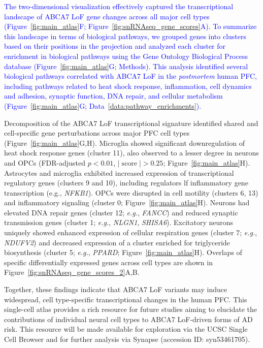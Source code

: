 \newcommand{\quoteG}{\textcolor{blue}{The two-dimensional visualization effectively captured the transcriptional landscape of ABCA7 LoF gene changes across all major cell types (Figure~\ref{fig:main_atlas}F; Figure~\ref{fig:snRNAseq_gene_scores}A). To summarize this landscape in terms of biological pathways, we grouped genes into clusters based on their positions in the projection and analyzed each cluster for enrichment in biological pathways using the Gene Ontology Biological Process database (Figure~\ref{fig:main_atlas}G; Methods). This analysis identified several biological pathways correlated with ABCA7 LoF in the \textit{postmortem} human PFC, including pathways related to heat shock response, inflammation, cell dynamics and adhesion, synaptic function, DNA repair, and cellular metabolism (Figure~\ref{fig:main_atlas}G; Data~\ref{data:pathway_enrichments}).\label{quoteG-label}}}\quoteG

Decomposition of the ABCA7 LoF transcriptional signature identified shared and cell-specific gene perturbations across major PFC cell types (Figure~\ref{fig:main_atlas}G,H). Microglia showed significant downregulation of heat shock response genes (cluster 11), also observed to a lesser degree in neurons and OPCs (FDR-adjusted $p<0.01$, $|\operatorname{score}|>0.25$; Figure~\ref{fig:main_atlas}H). Astrocytes and microglia exhibited increased expression of transcriptional regulatory genes (clusters 9 and 10), including regulators lf inflammatory gene transcription (e.g., \textit{NFKB1}). OPCs were disrupted in cell motility (clusters 6, 13) and inflammatory signaling (cluster 0; Figure~\ref{fig:main_atlas}H). Neurons had elevated DNA repair genes (cluster 12; \textit{e.g.}, \textit{FANCC}) and reduced synaptic transmission genes (cluster 1; \textit{e.g.}, \textit{NLGN1}, \textit{SHISA6}). Excitatory neurons uniquely showed enhanced expression of cellular respiration genes (cluster 7; \textit{e.g.}, \textit{NDUFV2}) and decreased expression of a cluster enriched for triglyceride biosynthesis (cluster 5; \textit{e.g.}, \textit{PPARD}; Figure~\ref{fig:main_atlas}H). Overlaps of specific differentially expressed genes across cell types are shown in Figure~\ref{fig:snRNAseq_gene_scores_2}A,B.

Together, these findings indicate that ABCA7 LoF variants may induce widespread, cell type-specific transcriptional changes in the human PFC. This single-cell atlas provides a rich resource for future studies aiming to elucidate the contributions of individual neural cell types to ABCA7 LoF-driven forms of AD risk. This resource will be made available for exploration via the UCSC Single Cell Browser and for further analysis via Synapse (accession ID: syn53461705).

